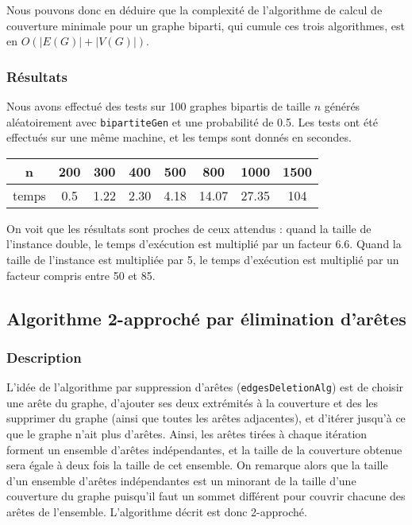 \documentclass[a4paper,10pt]{article}
\begin{document}
Nous pouvons donc en déduire que la complexité de l'algorithme de calcul de couverture minimale pour un graphe biparti, qui cumule ces trois algorithmes, est %
en $O(|E(G)|+ |V(G)|)$.

\subsubsection{Résultats}

Nous avons effectué des tests sur 100 graphes bipartis de taille $n$ générés aléatoirement avec \texttt{bipartiteGen} et une probabilité de 0.5. Les tests ont été effectués sur une même machine, et les temps sont donnés en secondes.

\begin{center}
\begin{tabular}{|c|c|c|c|c|c|c|c|}
	\hline 
	n & 200 & 300 & 400 & 500 & 800 & 1000 & 1500 \\
	\hline
	temps & 0.5 & 1.22 & 2.30 & 4.18 & 14.07 & 27.35 & 104 \\
	\hline
\end{tabular}
\end{center}

On voit que les résultats sont proches de ceux attendus : quand la taille de l'instance double, le temps d'exécution est multiplié par un facteur 6.6. Quand la taille de l'instance est multipliée par 5, le temps d'exécution est multiplié par un facteur compris entre 50 et 85. %

\subsection{Algorithme 2-approché par élimination d'arêtes}

\subsubsection{Description}

L'idée de l'algorithme par suppression d'arêtes (\texttt{edgesDeletionAlg}) est de choisir une arête du graphe, d'ajouter ses deux extrémités à la couverture et des les supprimer du graphe (ainsi que toutes les arêtes adjacentes), et d'itérer jusqu'à ce que le graphe n'ait plus d'arêtes. Ainsi, les arêtes tirées à chaque itération forment un ensemble d'arêtes indépendantes, et la taille de la couverture obtenue sera égale à deux fois la taille de cet ensemble. On remarque alors que la taille d'un ensemble d'arêtes indépendantes est un minorant de la taille d'une couverture du graphe puisqu'il faut un sommet différent pour couvrir chacune des arêtes de l'ensemble. L'algorithme décrit est donc 2-approché.
\end{document}
